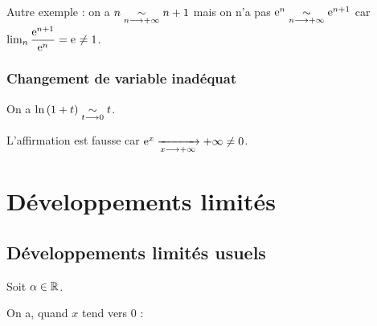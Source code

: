 Autre exemple : on a \(n\underset{n\longrightarrow+\infty}{\sim}n+1\) mais on n'a pas \(\mathrm{e}^{n}\underset{n\longrightarrow+\infty}{\sim}\mathrm{e}^{n+1}\) car \(\lim_n\dfrac{\mathrm{e}^{n+1}}{\mathrm{e}^{n}}=\mathrm{e}^{}\not=1\).

\subsubsection{Changement de variable inadéquat}

On a \(\ln\left(1+t\right)\underset{t\longrightarrow0}{\sim}t\).

L'affirmation  est fausse car \(\mathrm{e}^{x}\xrightarrow[x\longrightarrow+\infty]{}+\infty\not=0\).

\section{Développements limités}

\subsection*{Développements limités usuels}\label{subsec:développementsLimitésUsuels}

Soit \(\alpha\in\mathbb{R}\).

On a, quand \(x\) tend vers \(0\) :

